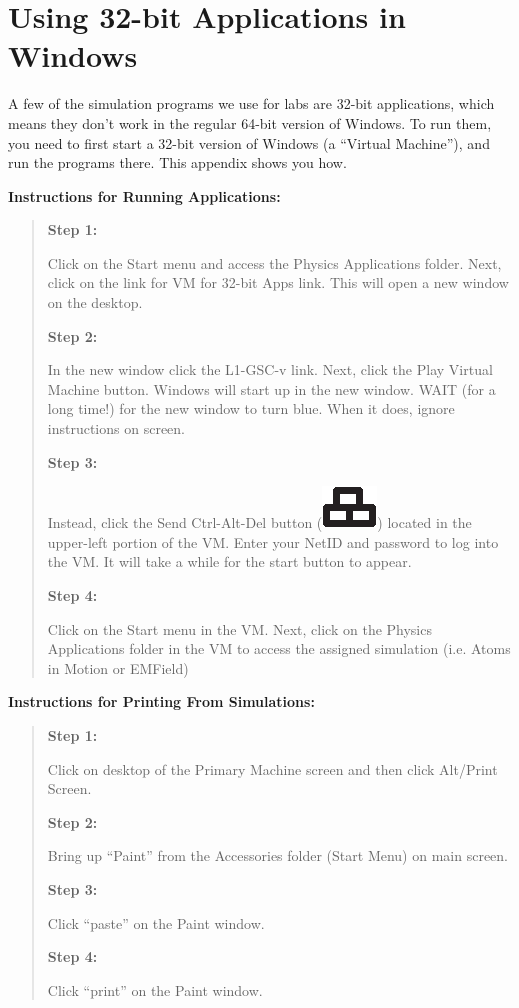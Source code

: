 ﻿\section{Using 32-bit Applications in Windows}
\label{virtual_machine}

A few of the simulation programs we use for labs are 32-bit applications, which means they don't work in the regular 64-bit version of Windows.  To run them, you need to first start a 32-bit version of Windows (a ``Virtual Machine''), and run the programs there.  This appendix shows you how.

\bigskip\textbf{Instructions for Running Applications:}

\begin{quote}
\textbf{Step 1:}
 
Click on the Start menu and access the Physics Applications folder.  Next, click on the link for VM for 32-bit Apps link.  This will open a new window on the desktop.

\medskip\textbf{Step 2:}

In the new window click the L1-GSC-v link.  Next, click the Play Virtual Machine button.  Windows will start up in the new window.   WAIT (for a long time!) for the new window to turn blue.  When it does, ignore instructions on screen. 

\medskip\textbf{Step 3:} 

Instead, click the Send Ctrl-Alt-Del button 
(\includegraphics{appendices/virtual_machine/ctrl_alt_del.eps}) 
located in the upper-left portion of the VM.  Enter your NetID and password to log into the VM.  It will take a while for the start button to appear.

\medskip\textbf{Step 4:}

Click on the Start menu in the VM.  Next, click on the Physics Applications folder in the VM to access the assigned simulation (i.e. Atoms in Motion or EMField)

\end{quote}

\bigskip\textbf{Instructions for Printing From Simulations:}

\begin{quote}
\textbf{Step 1:}
 
Click on desktop of the Primary Machine screen and then click Alt/Print Screen.  

\medskip\textbf{Step 2:}
 
Bring up ``Paint'' from the Accessories folder (Start Menu) on main screen.

\medskip\textbf{Step 3:}
 
Click ``paste'' on the Paint window.

\medskip\textbf{Step 4:}
 
Click ``print'' on the Paint window.
\end{quote}


